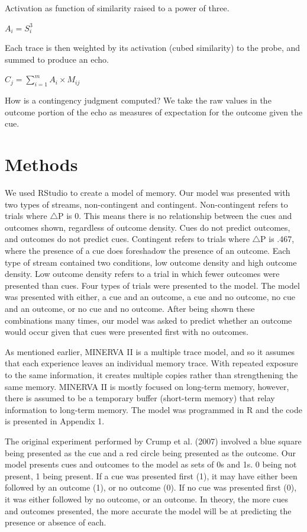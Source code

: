 \documentclass[
  english,
  man,floatsintext]{apa6}
\begin{document}
Activation as function of similarity raised to a power of three.

\(A_i = S_i^3\)

Each trace is then weighted by its activation (cubed similarity) to the probe, and summed to produce an echo.

\(C_j = \sum_{i=1}^m A_i \times M_{ij}\)

How is a contingency judgment computed? We take the raw values in the outcome portion of the echo as measures of expectation for the outcome given the cue.

\hypertarget{methods}{%
\section{Methods}\label{methods}}

We used RStudio to create a model of memory. Our model was presented with two types of streams, non-contingent and contingent. Non-contingent refers to trials where \(\triangle\)P is 0. This means there is no relationship between the cues and outcomes shown, regardless of outcome density. Cues do not predict outcomes, and outcomes do not predict cues. Contingent refers to trials where \(\triangle\)P is .467, where the presence of a cue does foreshadow the presence of an outcome. Each type of stream contained two conditions, low outcome density and high outcome density. Low outcome density refers to a trial in which fewer outcomes were presented than cues. Four types of trials were presented to the model. The model was presented with either, a cue and an outcome, a cue and no outcome, no cue and an outcome, or no cue and no outcome. After being shown these combinations many times, our model was asked to predict whether an outcome would occur given that cues were presented first with no outcomes.

As mentioned earlier, MINERVA II is a multiple trace model, and so it assumes that each experience leaves an individual memory trace. With repeated exposure to the same information, it creates multiple copies rather than strengthening the same memory. MINERVA II is mostly focused on long-term memory, however, there is assumed to be a temporary buffer (short-term memory) that relay information to long-term memory. The model was programmed in R and the code is presented in Appendix 1.

The original experiment performed by Crump et al. (2007) involved a blue square being presented as the cue and a red circle being presented as the outcome. Our model presents cues and outcomes to the model as sets of 0s and 1s. 0 being not present, 1 being present. If a cue was presented first (1), it may have either been followed by an outcome (1), or no outcome (0). If no cue was presented first (0), it was either followed by no outcome, or an outcome. In theory, the more cues and outcomes presented, the more accurate the model will be at predicting the presence or absence of each.
\end{document}
